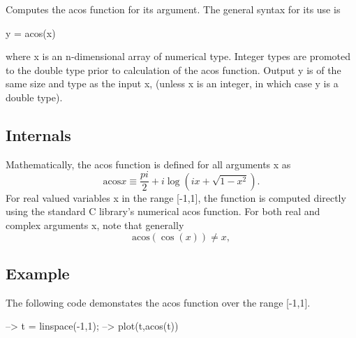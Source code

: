 Computes the {\ttfamily acos} function for its argument. The general syntax for its use is \begin{DoxyVerb}  y = acos(x)
\end{DoxyVerb}
 where {\ttfamily x} is an {\ttfamily n}-\/dimensional array of numerical type. Integer types are promoted to the {\ttfamily double} type prior to calculation of the {\ttfamily acos} function. Output {\ttfamily y} is of the same size and type as the input {\ttfamily x}, (unless {\ttfamily x} is an integer, in which case {\ttfamily y} is a {\ttfamily double} type). \hypertarget{transforms_svd_Function}{}\subsection{Internals}\label{transforms_svd_Function}
Mathematically, the {\ttfamily acos} function is defined for all arguments {\ttfamily x} as \[ \mathrm{acos} x \equiv \frac{pi}{2} + i \log \left(i x + \sqrt{1-x^2}\right). \] For real valued variables {\ttfamily x} in the range {\ttfamily \mbox{[}-\/1,1\mbox{]}}, the function is computed directly using the standard C library's numerical {\ttfamily acos} function. For both real and complex arguments {\ttfamily x}, note that generally \[ \mathrm{acos}(\cos(x)) \neq x, \] \hypertarget{variables_struct_Example}{}\subsection{Example}\label{variables_struct_Example}
The following code demonstates the {\ttfamily acos} function over the range {\ttfamily \mbox{[}-\/1,1\mbox{]}}.


\begin{DoxyVerbInclude}
--> t = linspace(-1,1);
--> plot(t,acos(t))
\end{DoxyVerbInclude}


